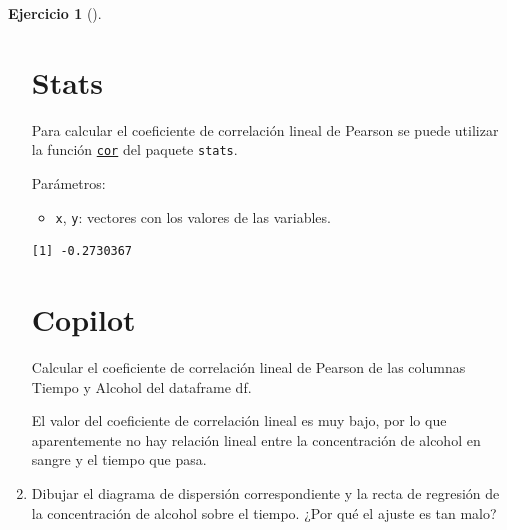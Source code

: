 \documentclass[
  a4paper,
]{scrreport}
\newenvironment{Shaded}{\begin{snugshade}}{\end{snugshade}}
\newcommand{\ExtensionTok}[1]{\textcolor[rgb]{0.00,0.23,0.31}{#1}}
\newcommand{\FunctionTok}[1]{\textcolor[rgb]{0.28,0.35,0.67}{#1}}
\newcommand{\KeywordTok}[1]{\textcolor[rgb]{0.00,0.23,0.31}{\textbf{#1}}}
\newcommand{\NormalTok}[1]{\textcolor[rgb]{0.00,0.23,0.31}{#1}}
\newcommand{\SpecialCharTok}[1]{\textcolor[rgb]{0.37,0.37,0.37}{#1}}
\providecommand{\tightlist}{%
  \setlength{\itemsep}{0pt}\setlength{\parskip}{0pt}}\usepackage{longtable,booktabs,array}
\theoremstyle{definition}
\newtheorem{exercise}{Ejercicio}[chapter]
\theoremstyle{remark}
\begin{document}
\begin{exercise}[]
\begin{enumerate}
\begin{tcolorbox}
  \section{Stats}

  Para calcular el coeficiente de correlación lineal de Pearson se puede
  utilizar la función
  \href{https://www.rdocumentation.org/packages/stats/versions/3.6.2/topics/cor}{\texttt{cor}}
  del paquete \texttt{stats}.

  Parámetros:

  \begin{itemize}
  \tightlist
  \item
    \texttt{x}, \texttt{y}: vectores con los valores de las variables.
  \end{itemize}

\begin{Shaded}
\end{Shaded}

\begin{verbatim}
[1] -0.2730367
\end{verbatim}

  \section{Copilot}

\begin{Shaded}
\begin{Highlighting}[]
\ExtensionTok{Calcular}\NormalTok{ el coeficiente de correlación lineal de Pearson de las columnas Tiempo y Alcohol del dataframe }\KeywordTok{\textasciigrave{}}\FunctionTok{df}\KeywordTok{\textasciigrave{}}\NormalTok{.}
\end{Highlighting}
\end{Shaded}

  El valor del coeficiente de correlación lineal es muy bajo, por lo que
  aparentemente no hay relación lineal entre la concentración de alcohol
  en sangre y el tiempo que pasa.

  \end{tcolorbox}
\item
  Dibujar el diagrama de dispersión correspondiente y la recta de
  regresión de la concentración de alcohol sobre el tiempo. ¿Por qué el
  ajuste es tan malo?


\end{enumerate}
\end{exercise}
\end{document}
